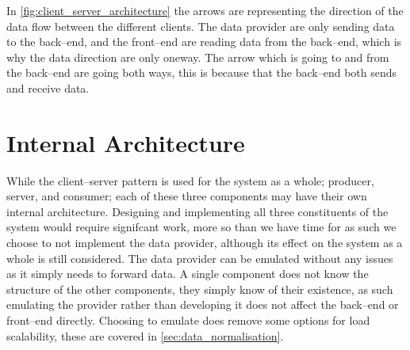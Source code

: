 In \cref{fig:client_server_architecture} the arrows are representing the direction of the data flow between the different clients.
The data provider are only sending data to the back--end, and the front--end are reading data from the back--end, which is why the data direction are only oneway.
The arrow which is going to and from the back--end are going both ways, this is because that the back--end both sends and receive data. 

\section{Internal Architecture}\label{sec:internal_architecture}
While the client--server pattern is used for the system as a whole; producer, server, and consumer; each of these three components may have their own internal architecture.
Designing and implementing all three constituents of the system would require signifcant work, more so than we have time for as such we choose to not implement the data provider, although its effect on the system as a whole is still considered.
The data provider can be emulated without any issues as it simply needs to forward data.
A single component does not know the structure of the other components, they simply know of their existence, as such emulating the provider rather than developing it does not affect the back--end or front--end directly.
Choosing to emulate does remove some options for load scalability, these are covered in \cref{sec:data_normalisation}.

